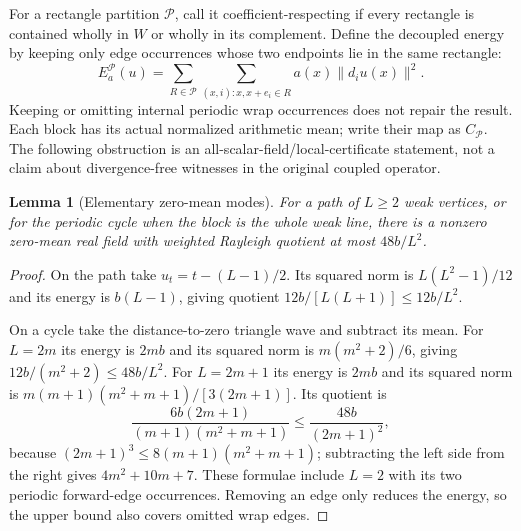 \documentclass[11pt]{article}
\newtheorem{lemma}{Lemma}
\begin{document}
For a rectangle partition $\mathcal P$, call it coefficient-respecting if every rectangle is contained wholly in $W$ or wholly in its complement. Define the decoupled energy by keeping only edge occurrences whose two endpoints lie in the same rectangle:
\[
 E_a^{\mathcal P}(u)=\sum_{R\in\mathcal P}\sum_{(x,i):x,x+e_i\in R}
 a(x)\|d_i u(x)\|^2.
\]
Keeping or omitting internal periodic wrap occurrences does not repair the result. Each block has its actual normalized arithmetic mean; write their map as $C_{\mathcal P}$. The following obstruction is an all-scalar-field/local-certificate statement, not a claim about divergence-free witnesses in the original coupled operator.

\begin{lemma}[Elementary zero-mean modes]\label{lem:modes}
For a path of $L\ge2$ weak vertices, or for the periodic cycle when the block is the whole weak line, there is a nonzero zero-mean real field with weighted Rayleigh quotient at most $48b/L^2$.
\end{lemma}
\begin{proof}
On the path take $u_t=t-(L-1)/2$. Its squared norm is $L(L^2-1)/12$ and its energy is $b(L-1)$, giving quotient $12b/[L(L+1)]\le12b/L^2$.

On a cycle take the distance-to-zero triangle wave and subtract its mean. For $L=2m$ its energy is $2mb$ and its squared norm is $m(m^2+2)/6$, giving $12b/(m^2+2)\le48b/L^2$. For $L=2m+1$ its energy is $2mb$ and its squared norm is
$m(m+1)(m^2+m+1)/[3(2m+1)]$. Its quotient is
\[
 \frac{6b(2m+1)}{(m+1)(m^2+m+1)}\le\frac{48b}{(2m+1)^2},
\]
because $(2m+1)^3\le8(m+1)(m^2+m+1)$; subtracting the left side from the right gives $4m^2+10m+7$. These formulae include $L=2$ with its two periodic forward-edge occurrences. Removing an edge only reduces the energy, so the upper bound also covers omitted wrap edges.
\end{proof}
\end{document}
